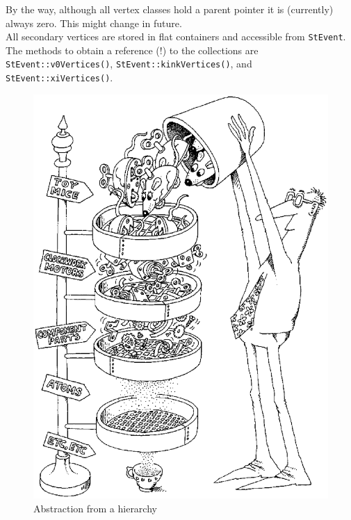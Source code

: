 \documentclass[twoside]{article}
\begin{document}
By the way, although all vertex classes hold a parent pointer it is
(currently) always zero. This might change in future. \\
All secondary vertices are stored in flat containers and accessible
from \texttt{StEvent}. The methods to obtain a reference (!) to the
collections are \texttt{StEvent::v0Vertices()},
\texttt{StEvent::kinkVertices()}, and \texttt{StEvent::xiVertices()}.
\begin{figure}[htb]
    \begin{center}
        \includegraphics[height=0.7\textheight]{cartoon3.eps}
        \caption{Abstraction from a hierarchy}
    \end{center}
\end{figure}
\end{document}
